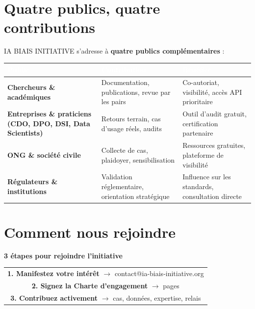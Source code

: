 \documentclass[11pt,a4paper,openany]{book}
\begin{document}
\section{Quatre publics, quatre contributions}

IA BIAIS INITIATIVE s'adresse à \textbf{quatre publics complémentaires} :

\begin{center}
\renewcommand{\arraystretch}{1.4}
\small
\begin{tabularx}{\textwidth}{@{}>{\bfseries}p{4cm}X X@{}}
\toprule
\rowcolor{navy}
\textcolor{white}{Public} & \textcolor{white}{Contribution} & \textcolor{white}{Bénéfice} \\
\midrule
\textbf{Chercheurs \& académiques} & Documentation, publications, revue par les pairs & Co-autoriat, visibilité, accès API prioritaire \\
\rowcolor{light}
\textbf{Entreprises \& praticiens} \newline \footnotesize (CDO, DPO, DSI, Data Scientists) & Retours terrain, cas d'usage réels, audits & Outil d'audit gratuit, certification partenaire \\
\textbf{ONG \& société civile} & Collecte de cas, plaidoyer, sensibilisation & Ressources gratuites, plateforme de visibilité \\
\rowcolor{light}
\textbf{Régulateurs \& institutions} & Validation réglementaire, orientation stratégique & Influence sur les standards, consultation directe \\
\bottomrule
\end{tabularx}
\end{center}

\section{Comment nous rejoindre}

\begin{ctabox}
\begin{center}
{\Large\textbf{3 étapes pour rejoindre l'initiative}}\\[10pt]
\begin{tabular}{@{}c@{}}
\textbf{1. Manifestez votre intérêt} \quad $\rightarrow$ \quad contact@ia-biais-initiative.org\\[8pt]
\textbf{2. Signez la Charte d'engagement} \quad $\rightarrow$ \quad 2 pages\\[8pt]
\textbf{3. Contribuez activement} \quad $\rightarrow$ \quad cas, données, expertise, relais
\end{tabular}
\end{center}
\end{ctabox}
\end{document}
